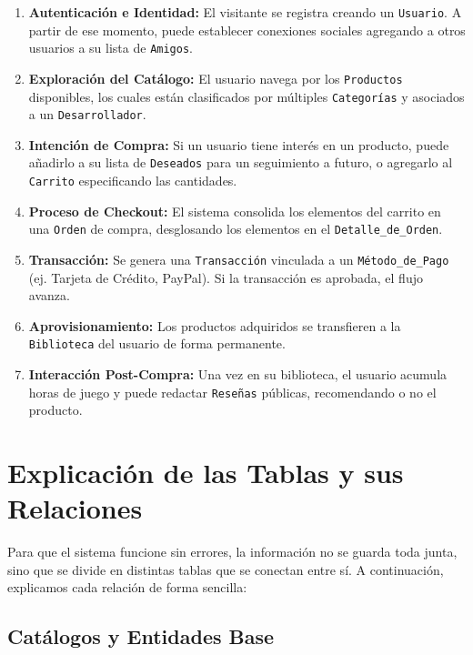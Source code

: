 \documentclass[11pt,a4paper]{article}
\begin{document}
\begin{enumerate}[label=\arabic*.]
\item \textbf{Autenticación e Identidad:} El visitante se registra creando un \texttt{Usuario}. A partir de ese momento, puede establecer conexiones sociales agregando a otros usuarios a su lista de \texttt{Amigos}.

\item \textbf{Exploración del Catálogo:} El usuario navega por los \texttt{Productos} disponibles, los cuales están clasificados por múltiples \texttt{Categorías} y asociados a un \texttt{Desarrollador}.

\item \textbf{Intención de Compra:} Si un usuario tiene interés en un producto, puede añadirlo a su lista de \texttt{Deseados} para un seguimiento a futuro, o agregarlo al \texttt{Carrito} especificando las cantidades.

\item \textbf{Proceso de Checkout:} El sistema consolida los elementos del carrito en una \texttt{Orden} de compra, desglosando los elementos en el \texttt{Detalle\_de\_Orden}.

\item \textbf{Transacción:} Se genera una \texttt{Transacción} vinculada a un \texttt{Método\_de\_Pago} (ej. Tarjeta de Crédito, PayPal). Si la transacción es aprobada, el flujo avanza.

\item \textbf{Aprovisionamiento:} Los productos adquiridos se transfieren a la \texttt{Biblioteca} del usuario de forma permanente.

\item \textbf{Interacción Post-Compra:} Una vez en su biblioteca, el usuario acumula horas de juego y puede redactar \texttt{Reseñas} públicas, recomendando o no el producto.
\end{enumerate}

\section{Explicación de las Tablas y sus Relaciones}

Para que el sistema funcione sin errores, la información no se guarda toda junta, sino que se divide en distintas tablas que se conectan entre sí. A continuación, explicamos cada relación de forma sencilla:

\subsection{Catálogos y Entidades Base}
\end{document}
